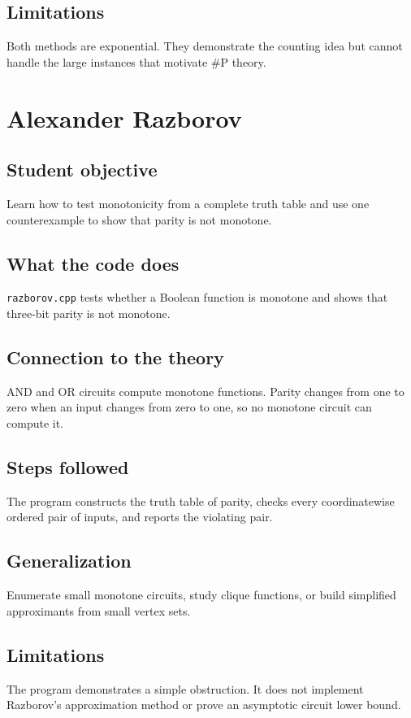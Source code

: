\documentclass[11pt]{book}
\begin{document}
\section{Limitations}
Both methods are exponential. They demonstrate the counting idea but cannot handle the large instances that motivate \#P theory.

\chapter{Alexander Razborov}
\section{Student objective}
Learn how to test monotonicity from a complete truth table and use one counterexample to show that parity is not monotone.
\section{What the code does}
\texttt{razborov.cpp} tests whether a Boolean function is monotone and shows that three-bit parity is not monotone.

\section{Connection to the theory}
AND and OR circuits compute monotone functions. Parity changes from one to zero when an input changes from zero to one, so no monotone circuit can compute it.

\section{Steps followed}
The program constructs the truth table of parity, checks every coordinatewise ordered pair of inputs, and reports the violating pair.

\section{Generalization}
Enumerate small monotone circuits, study clique functions, or build simplified approximants from small vertex sets.

\section{Limitations}
The program demonstrates a simple obstruction. It does not implement Razborov's approximation method or prove an asymptotic circuit lower bound.
\end{document}

